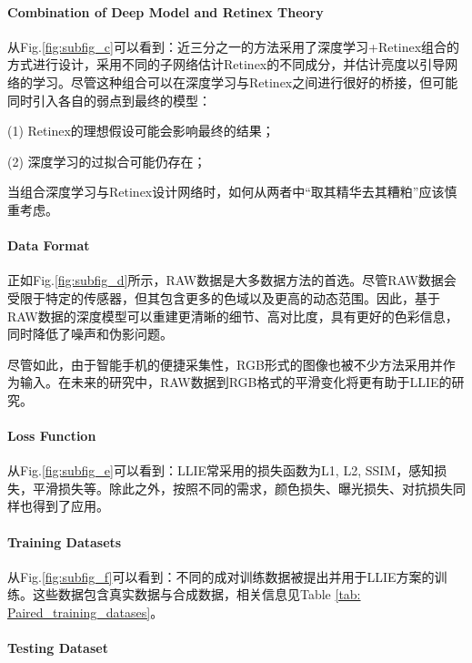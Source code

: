 \documentclass[letterpaper,12pt]{article}
\begin{document}
	
	\paragraph{Combination of Deep Model and Retinex Theory} \qquad
	
	从Fig.\ref{fig:subfig_c}可以看到：近三分之一的方法采用了深度学习+Retinex组合的方式进行设计，采用不同的子网络估计Retinex的不同成分，并估计亮度以引导网络的学习。尽管这种组合可以在深度学习与Retinex之间进行很好的桥接，但可能同时引入各自的弱点到最终的模型：
	
	(1) Retinex的理想假设可能会影响最终的结果；
	
	(2) 深度学习的过拟合可能仍存在；
	
	当组合深度学习与Retinex设计网络时，如何从两者中“取其精华去其糟粕”应该慎重考虑。
	
	
	\paragraph{Data Format} \qquad
	
	正如Fig.\ref{fig:subfig_d}所示，RAW数据是大多数据方法的首选。尽管RAW数据会受限于特定的传感器，但其包含更多的色域以及更高的动态范围。因此，基于RAW数据的深度模型可以重建更清晰的细节、高对比度，具有更好的色彩信息，同时降低了噪声和伪影问题。
	
	尽管如此，由于智能手机的便捷采集性，RGB形式的图像也被不少方法采用并作为输入。在未来的研究中，RAW数据到RGB格式的平滑变化将更有助于LLIE的研究。
	
	
	\paragraph{Loss Function} \qquad
	
	从Fig.\ref{fig:subfig_e}可以看到：LLIE常采用的损失函数为L1, L2, SSIM，感知损失，平滑损失等。除此之外，按照不同的需求，颜色损失、曝光损失、对抗损失同样也得到了应用。
	
	\paragraph{Training Datasets} \qquad
	
	从Fig.\ref{fig:subfig_f}可以看到：不同的成对训练数据被提出并用于LLIE方案的训练。这些数据包含真实数据与合成数据，相关信息见Table \ref{tab: Paired_training_datases}。
	
	\paragraph{Testing Dataset} \qquad
	
\end{document}
